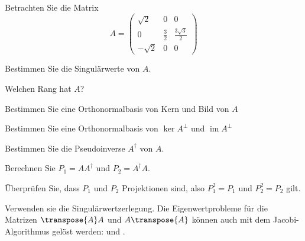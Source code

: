 Betrachten Sie die Matrix
\[
A=
\begin{pmatrix}
\sqrt{2} & 0 & 0 \\
0 & \frac32 & \frac{3\sqrt{3}}2 \\
-\sqrt{2} & 0 & 0
\end{pmatrix}
\]
\begin{teilaufgaben}
\item Bestimmen Sie die Singulärwerte von $A$.
\item Welchen Rang hat $A$?
\item Bestimmen Sie eine Orthonormalbasis von Kern und Bild von $A$
\item Bestimmen Sie eine Orthonormalbasis von $\operatorname{ker}A^\perp$
und $\operatorname{im}A^\perp$
\item Bestimmen Sie die Pseudoinverse $A^\dagger$ von $A$.
\item Berechnen Sie $P_1=AA^\dagger$ und $P_2=A^\dagger A$.
\item Überprüfen Sie, dass $P_1$ und $P_2$ Projektionen sind, also
$P_1^2=P_1$ und $P_2^2=P_2$ gilt.
\end{teilaufgaben}

\begin{hinweis}
Verwenden sie die Singulärwertzerlegung.
Die Eigenwertprobleme für die Matrizen $\transpose{A}A$ und $A\transpose{A}$
können auch mit dem Jacobi-Algorithmus gelöst werden:
 und .
\end{hinweis}


